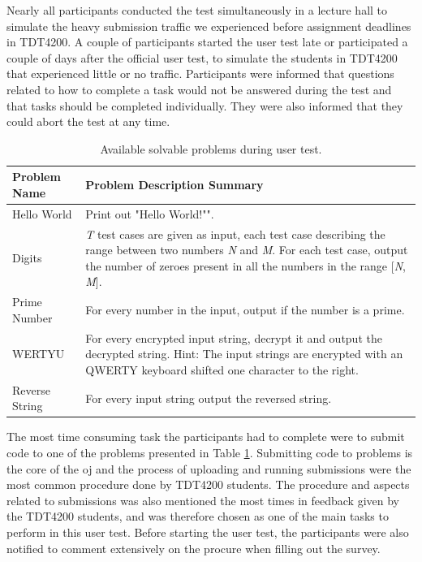 Nearly all participants conducted the test simultaneously in a lecture hall to simulate the heavy submission traffic we experienced before assignment deadlines in TDT4200. A couple of participants started the user test late or participated a couple of days after the official user test, to simulate the students in TDT4200 that experienced little or no traffic. Participants were informed that questions related to how to complete a task would not be answered during the test and that tasks should be completed individually. They were also informed that they could abort the test at any time. \\

\begin{table}
    \centering
    \begin{tabular}{ | l | p{6cm} |}
    \hline
    \textbf{Problem Name} & \textbf{Problem Description Summary} \\ \hline
    Hello World & Print out "Hello World!"". \\ \hline
    Digits & \textit{T} test cases are given as input, each test case describing the range between two numbers \textit{N} and \textit{M}. For each test case, output the number of zeroes present in all the numbers in the range [\textit{N}, \textit{M}]. \\ \hline
    Prime Number & For every number in the input, output if the number is a prime. \\ \hline
    WERTYU & For every encrypted input string, decrypt it and output the decrypted string. Hint: The input strings are encrypted with an QWERTY keyboard shifted one character to the right. \\ \hline
    Reverse String & For every input string output the reversed string. \\
    \hline
    \end{tabular}
    \caption{Available solvable problems during user test.}
    \label{tab:avail-prob}
\end{table}

The most time consuming task the participants had to complete were to submit code to one of the problems presented in Table \ref{tab:avail-prob}. Submitting code to problems is the core of the \gls{oj} and the process of uploading and running submissions were the most common procedure done by TDT4200 students. The procedure and aspects related to submissions was also mentioned the most times in feedback given by the TDT4200 students, and was therefore chosen as one of the main tasks to perform in this user test. Before starting the user test, the participants were also notified to comment extensively on the procure when filling out the survey. \\

